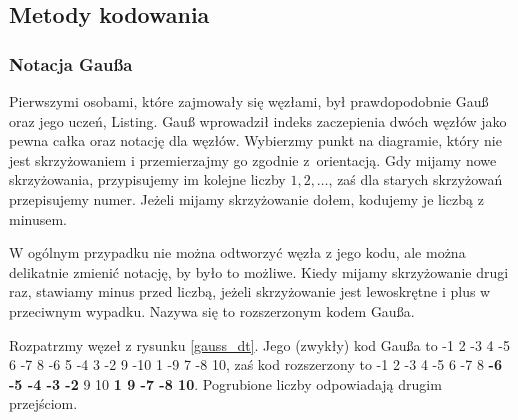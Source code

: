 
\subsection{Metody kodowania}
\subsubsection{Notacja Gaußa}
%
Pierwszymi osobami, które zajmowały się węzłami, był prawdopodobnie Gauß oraz jego uczeń, Listing.
%
%
Gauß wprowadził indeks zaczepienia dwóch węzłów jako pewna całka oraz notację dla węzłów.
Wybierzmy punkt na diagramie, który nie jest skrzyżowaniem i przemierzajmy go zgodnie z~orientacją.
Gdy mijamy nowe skrzyżowania, przypisujemy im kolejne liczby $1, 2, \ldots$, zaś dla starych skrzyżowań przepisujemy numer.
Jeżeli mijamy skrzyżowanie dołem, kodujemy je liczbą z minusem.

W ogólnym przypadku nie można odtworzyć węzła z jego kodu, ale można delikatnie zmienić notację, by było to możliwe.
Kiedy mijamy skrzyżowanie drugi raz, stawiamy minus przed liczbą, jeżeli skrzyżowanie jest lewoskrętne i plus w przeciwnym wypadku.
Nazywa się to rozszerzonym kodem Gaußa.

\begin{example}
    Rozpatrzmy węzeł z rysunku \ref{gauss_dt}.
    Jego (zwykły) kod Gaußa to {-1 2 -3 4 -5 6 -7 8 -6 5 -4 3 -2 9 -10 1 -9 7 -8 10}, zaś kod rozszerzony to {-1 2 -3 4 -5 6 -7 8 \textbf{-6 -5 -4 -3 -2} 9 10 \textbf{1 9 -7 -8 10}}.
    Pogrubione liczby odpowiadają drugim przejściom.
\end{example}

